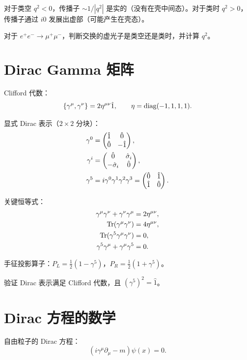 对于类空 $q^2<0$，传播子 $\sim 1/|q^2|$ 是实的（没有在壳中间态）。对于类时 $q^2>0$，传播子通过 $i0$ 发展出虚部（可能产生在壳态）。

\begin{exercise}
对于 $e^+e^-\to\mu^+\mu^-$，判断交换的虚光子是类空还是类时，并计算 $q^2$。
\end{exercise}

\section{Dirac Gamma 矩阵}

Clifford 代数：
\begin{equation}
\{\gamma^\mu,\gamma^\nu\} = 2\eta^{\mu\nu}\hat 1,
\qquad \eta={\rm diag}(-1,1,1,1).
\label{eq:10.6.1}
\end{equation}

显式 Dirac 表示（$2\times2$ 分块）：
\begin{align}
\gamma^0 &= \begin{pmatrix}\hat 1&\hat 0\\\hat 0&-\hat 1\end{pmatrix},\\
\gamma^i &= \begin{pmatrix}\hat 0&\hat\sigma_i\\-\hat\sigma_i&\hat 0\end{pmatrix},\\
\gamma^5 &= i\gamma^0\gamma^1\gamma^2\gamma^3
= \begin{pmatrix}\hat 0&\hat 1\\\hat 1&\hat 0\end{pmatrix}.
\label{eq:10.6.2}
\end{align}

关键恒等式：
\begin{align}
\gamma^\mu\gamma^\nu+\gamma^\nu\gamma^\mu &= 2\eta^{\mu\nu},\\
\operatorname{Tr}(\gamma^\mu\gamma^\nu) &= 4\eta^{\mu\nu},\\
\operatorname{Tr}(\gamma^5\gamma^\mu\gamma^\nu) &= 0,\\
\gamma^5\gamma^\mu+\gamma^\mu\gamma^5 &= 0.
\label{eq:10.6.3}
\end{align}

手征投影算子：$P_L=\frac12(1-\gamma^5)$，$P_R=\frac12(1+\gamma^5)$。

\begin{exercise}
验证 Dirac 表示满足 Clifford 代数，且 $(\gamma^5)^2=\hat 1$。
\end{exercise}

\section{Dirac 方程的数学}

自由粒子的 Dirac 方程：
\begin{equation}
(i\gamma^\mu\partial_\mu - m)\psi(x) = 0.
\label{eq:10.7.1}
\end{equation}

